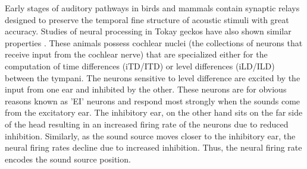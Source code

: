 Early stages of auditory pathways in birds and mammals contain synaptic relays designed to preserve the temporal fine structure of 
acoustic stimuli with great accuracy.  Studies of neural processing in Tokay geckos have also shown similar properties \cite{dalsgaardtangcarr}.
These animals possess cochlear nuclei (the collections of neurons that receive input from the cochlear nerve) that are specialized either for
the computation of time differences (iTD/ITD) or level differences (iLD/ILD) between the tympani. The neurons sensitive to level difference are excited by the 
input from one ear and inhibited by the other. These neurons are for obvious reasons known as 'EI' neurons and respond most strongly when the
sounds come from the excitatory ear. The inhibitory ear, on the other hand sits on the far side of the head resulting in an increased firing
rate of the neurons due to reduced inhibition. Similarly, as the sound source moves closer to the inhibitory ear, the neural firing rates decline
due to increased inhibition. Thus, the neural firing rate encodes the sound source position. 

